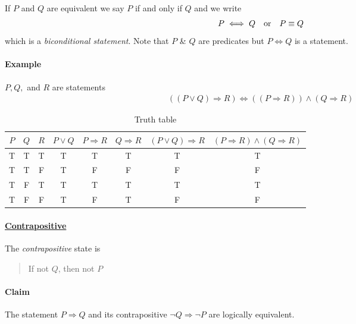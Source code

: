 \documentclass[../main.tex]{subfiles}
\begin{document}
If $P$ and $Q$ are equivalent we say $P$ if and only if $Q$ and we write
\begin{align*}
    P \iff Q \qqtext{or} P \equiv Q
\end{align*}
which is a \emph{biconditional statement}. Note that $P$ \& $Q$ are predicates but $P \iff Q$ is a
statement.

\paragraph{Example} $P, Q,$ and $R$ are statements
\begin{align*}
    ((P \lor Q) \Rightarrow R) \iff ((P \Rightarrow R)) \land (Q \Rightarrow R)
\end{align*}
\begin{table}[ht]
    \centering
    \begin{tabular}{c|c|c|c|c|c|c|c}
        $P$ & $Q$ & $R$ & $P \lor Q$ & $P \Rightarrow R$ & $Q \Rightarrow R$ & $(P \lor Q) \Rightarrow R$  & $(P \Rightarrow R) \land (Q \Rightarrow R)$ \\
        \hline
        T & T & T & T & T & T & T & T \\
        T & T & F & T & F & F & F & F \\
        T & F & T & T & T & T & T & T \\
        T & F & F & T & F & T & F & F \\
    \end{tabular}
    \caption{Truth table}
\end{table}

\newpage
{}

\paragraph{\underline{Contrapositive}}

The \emph{contrapositive} state is

\begin{quote}
    If not $Q$, then not $P$
\end{quote}

\paragraph{Claim}

The statement $P \Rightarrow Q$ and its contrapositive $\neg Q \Rightarrow \neg P$ are logically 
equivalent.
\end{document}

